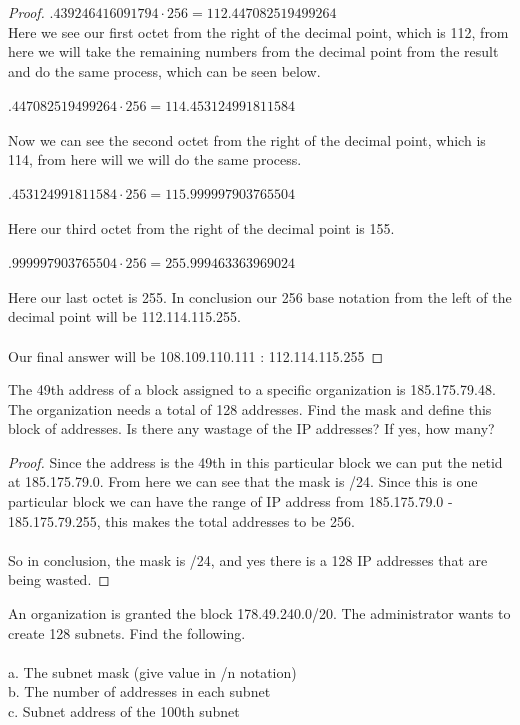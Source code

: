 \documentclass[12pt]{article}
\newenvironment{exercise}[2][Exercise]{\begin{trivlist}
\item[\hskip \labelsep {\bfseries #1}\hskip \labelsep {\bfseries #2.}]}{\end{trivlist}}
\begin{document}
\begin{proof}
$.439246416091794 \cdot 256 = 112.447082519499264$ \\
Here we see our first octet from the right of the decimal point, which is 112, from here we will take the remaining numbers from the decimal point from the result and do the same process, which can be seen below. \\ \\
$.447082519499264 \cdot 256 = 114.453124991811584$ \\ \\ 
Now we can see the second octet from the right of the decimal point, which is 114, from here will we will do the same process. \\ \\ 
$.453124991811584 \cdot 256 = 115.999997903765504$ \\ \\ 
Here our third octet from the right of the decimal point is 155. \\ \\ 
$.999997903765504 \cdot 256 = 255.999463363969024$ \\ \\ 
Here our last octet is 255. In conclusion our 256 base notation from the left of the decimal point will be 112.114.115.255. \\ \\ 
Our final answer will be 108.109.110.111 : 112.114.115.255
\end{proof}

\begin{exercise}{10}
The 49th address of a block assigned to a specific organization is 185.175.79.48. The organization needs a total of 128 addresses. Find the mask and define this block of addresses. Is there any wastage of the IP addresses? If yes, how many? 
\end{exercise}

\begin{proof}
Since the address is the 49th in this particular block we can put the netid at 185.175.79.0. From here we can see that the mask is /24. Since this is one particular block we can have the range of IP address from 185.175.79.0 - 185.175.79.255, this makes the total addresses to be 256. \\ \\ 
So in conclusion, the mask is /24, and yes there is a 128 IP addresses that are being wasted. 
\end{proof}

\begin{exercise}{11}
An organization is granted the block 178.49.240.0/20. The administrator wants to create 128 subnets. Find the following. \\ \\
a. The subnet mask (give value in /n notation) \\ 
b. The number of addresses in each subnet \\ c. Subnet address of the 100th subnet
\end{exercise}
\end{document}
